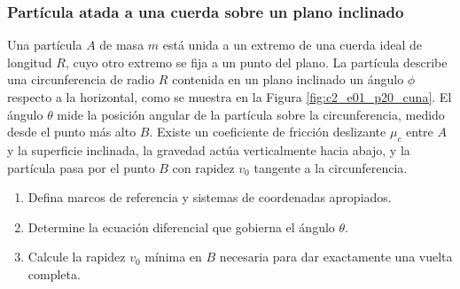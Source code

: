 \subsubsection{Partícula atada a una cuerda sobre un plano inclinado}

Una partícula $A$ de masa $m$ está unida a un extremo de una cuerda ideal de longitud $R$,
cuyo otro extremo se fija a un punto del plano. La partícula describe una circunferencia de
radio $R$ contenida en un plano inclinado un ángulo $\phi$ respecto a la horizontal, como se
muestra en la Figura \ref{fig:c2_e01_p20_cuna}. El ángulo $\theta$ mide la posición angular
de la partícula sobre la circunferencia, medido desde el punto más alto $B$. Existe un
coeficiente de fricción deslizante $\mu_c$ entre $A$ y la superficie inclinada, la gravedad
actúa verticalmente hacia abajo, y la partícula pasa por el punto $B$ con rapidez $v_0$
tangente a la circunferencia.

\begin{enumerate}
    \item Defina marcos de referencia y sistemas de coordenadas apropiados.
    \item Determine la ecuación diferencial que gobierna el ángulo $\theta$.
    \item Calcule la rapidez $v_0$ mínima en $B$ necesaria para dar exactamente una vuelta
          completa.
\end{enumerate}

